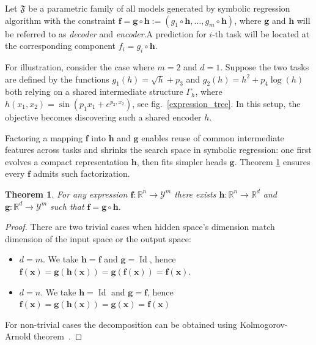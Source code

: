 \documentclass[14pt]{extarticle}
\newtheorem{theorem}{Theorem}[section]
\begin{document}
    Let \(\mathfrak{F}\) be a parametric family of all models generated by symbolic regression algorithm with the constraint \(\mathbf{f} = \mathbf{g} \circ \mathbf{h} := \left( g_1 \circ \mathbf{h}, \dots, g_m \circ \mathbf{h} \right)\), where \(\mathbf{g}\) and \(\mathbf{h}\) will be referred to as \textit{decoder} and \textit{encoder}.A prediction for \(i\)-th task will be located at the corresponding component \(f_i = g_i \circ \mathbf{h}\). 

    For illustration, consider the case where \(m=2\) and \(d=1\). Suppose the two tasks are defined by the functions \(g_1(h) = \sqrt{h} + p_3\) and \(g_2(h) = h^2 + p_4 \log(h)\) both relying on a shared intermediate structure \(\Gamma_h\), where \(h(x_1, x_2) = \sin(p_1x_1 + e^{p_2, x_2})\), see fig.~\ref{expression_tree}. In this setup, the objective becomes discovering such a shared encoder \(h\).

    Factoring a mapping \(\mathbf{f}\) into \(\mathbf{h}\) and \(\mathbf{g}\) enables reuse of common intermediate features across tasks and shrinks the search space in symbolic regression: one first evolves a compact representation \(\mathbf{h}\), then fits simpler heads \(\mathbf{g}\). Theorem \ref{decomposition} ensures every \(\mathbf{f}\) admits such factorization.
    \begin{theorem}\label{decomposition}
        For any expression \(\mathbf{f}: \mathbb{R}^n \rightarrow \mathcal{Y}^m\) there exists \(\mathbf{h}:\mathbb{R}^n\rightarrow \mathbb{R}^d\) and \(\mathbf{g}:\mathbb{R}^d\rightarrow \mathcal{Y}^m\) such that \(\mathbf{f} = \mathbf{g} \circ \mathbf{h}\).
    \end{theorem}
    \begin{proof}
        There are two trivial cases when hidden space's dimension match dimension of the input space or the output space:
        \begin{itemize}
            \item \(d = m\). We take \(\mathbf{h} = \mathbf{f}\) and \(\mathbf{g} = \operatorname{Id}\), hence \(\mathbf{f}(\mathbf{x}) = \mathbf{g}(\mathbf{h}(\mathbf{x})) = \mathbf{g}(\mathbf{f}(\mathbf{x})) = \mathbf{f}(\mathbf{x})\).
            \item \(d = n\). We take \(\mathbf{h}=\operatorname{Id}\) and \(\mathbf{g}=\mathbf{f}\), hence \(\mathbf{f}(\mathbf{x}) = \mathbf{g}(\mathbf{h}(\mathbf{x})) = \mathbf{g}(\mathbf{x}) = \mathbf{f}(\mathbf{x})\)
        \end{itemize}
        For non-trivial cases the decomposition can be obtained using Kolmogorov-Arnold theorem~\cite{kolmogorov1961representation}. 
    \end{proof}
    
\end{document}
